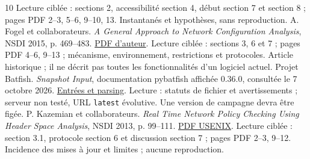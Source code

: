 \documentclass[11pt,a4paper]{article}
\newcommand{\code}[1]{\nolinkurl{#1}}
\begin{document}
\begin{thebibliography}{10}
Lecture ciblée : sections 2, accessibilité section 4, début section 7 et section
8 ; pages PDF 2--3, 5--6, 9--10, 13. Instantanés et hypothèses, sans reproduction.
 A. Fogel et collaborateurs. \emph{A General Approach to
Network Configuration Analysis}, NSDI 2015, p. 469--483.
\href{https://ratul.org/papers/nsdi2015-batfish.pdf}{PDF d'auteur}.
Lecture ciblée : sections 3, 6 et 7 ; pages PDF 4--6, 9--13 ; mécanisme,
environnement, restrictions et protocoles. Article historique ; il ne décrit
pas toutes les fonctionnalités d'un logiciel actuel.
 Projet Batfish. \emph{Snapshot Input}, documentation
pybatfish affichée 0.36.0, consultée le 7 octobre 2026.
\href{https://batfish.readthedocs.io/en/latest/notebooks/snapshot.html}{Entrées et parsing}.
Lecture : statuts de fichier et avertissements ; serveur non testé, URL
\code{latest} évolutive. Une version de campagne devra être figée.
 P. Kazemian et collaborateurs. \emph{Real Time Network
Policy Checking Using Header Space Analysis}, NSDI 2013, p. 99--111.
\href{https://www.usenix.org/system/files/conference/nsdi13/nsdi13-final8.pdf}{PDF USENIX}.
Lecture ciblée : section 3.1, protocole section 6 et discussion section 7 ;
pages PDF 2--3, 9--12. Incidence des mises à jour et limites ; aucune reproduction.
\end{thebibliography}
\end{document}
